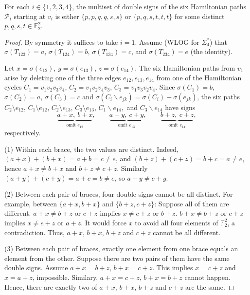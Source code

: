 \documentclass[10pt,a4paper]{amsart}
\begin{document}
\begin{lemma}\label{lemma4}
For each \(i\in\{1,2,3,4\}\), the multiset of double signs of the six Hamiltonian paths
\(\mathscr{P}_i\) starting at \(v_i\) is either
\(\{p,p,q,q,s,s\}\) or \(\{p,q,s,t,t,t\}\) for some distinct
\(p,q,s,t\in\mathbb F_2^2\).
\end{lemma}

\begin{proof}
By symmetry it suffices to take \(i=1\).
Assume (WLOG for \(\Sigma_4^*\)) that
\(\sigma(T_{123})=a\), \(\sigma(T_{124})=b\), \(\sigma(T_{134})=c\), and
\(\sigma(T_{234})=e\) (the identity). 

Let \(x=\sigma(e_{12})\), \(y=\sigma(e_{13})\), \(z=\sigma(e_{14})\).
The six Hamiltonian paths from \(v_1\) arise by deleting one of the three
edges \(e_{12},e_{13},e_{14}\) from one of the Hamiltonian cycles
\(C_1=v_1v_2v_3v_4\), \(C_2=v_1v_2v_4v_3\), \(C_3=v_1v_3v_2v_4\).
Since \(\sigma(C_1)=b\), \(\sigma(C_2)=a\), \(\sigma(C_3)=c\) and $\sigma(C_i\backslash e_{jk})=\sigma(C_i)+\sigma(e_{jk})$,
the six paths   \(C_{2}\setminus e_{12}\), \(C_{1}\setminus e_{12}\),
\(C_{2}\setminus e_{13}\),  \(C_{3}\setminus e_{13}\), $C_1\backslash e_{14},$ and $ C_3\backslash e_{14}$ 
have signs 
\[
\underbrace{a+x,\ b+x}_{\text{omit }e_{12}},\qquad
\underbrace{a+y,\ c+y}_{\text{omit }e_{13}},\qquad
\underbrace{b+z,\ c+z}_{\text{omit }e_{14}},
\] respectively.

(1) Within each brace, the two values are distinct.
Indeed,
\((a+x)+(b+x)=a+b=c\neq e\), and \((b+z)+(c+z)=b+c=a\neq e\), hence
\(a+x\ne b+x\) and \(b+z\ne c+z\). Similarly \((a+y)+(c+y)=a+c=b\ne e\), so
\(a+y\ne c+y\).

(2) Between each pair of braces, four double signs cannot be all distinct. 
For example, between \(\{a+x,b+x\}\) and \(\{b+z,c+z\}\):  Suppose all of them are different. $a+x\neq b+z$ or $c+z$ implies $x\neq c+z$ or $b+z$. $b+x\neq b+z$ or $c+z$ implies $x\neq e+z$ or $a+z$. It would force 
$x$ to avoid all four elements of $\mathbb{F}_2^2$, a contradiction. Thus, $a+x$, $b+x$, $b+z$ and $c+z$ cannot be all different.


(3) Between each pair of braces, exactly one element from one brace equals an element from the other.
 Suppose there are two pairs of them have the same double signs. Assume 
     $a+x=b+z$, $b+x=c+z$. This implies $x=c+z$ and $x=a+z$, impossible. Similary, $a+x=c+z$, $b+x=b+z$ cannot happen. Hence, there are exactly two of $a+x$, $b+x$, $b+z$ and $c+z$ are the same. 


\end{proof}
\end{document}
